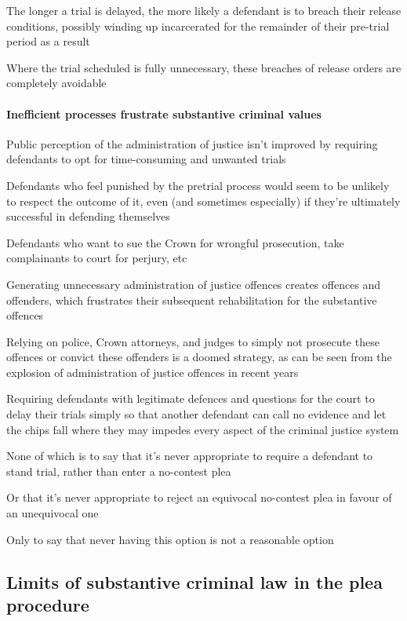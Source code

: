 The longer a trial is delayed, the more likely a defendant is to breach their release conditions, possibly winding up incarcerated for the remainder of their pre-trial period as a result

Where the trial scheduled is fully unnecessary, these breaches of release orders are completely avoidable

\paragraph{Inefficient processes frustrate substantive criminal values}

Public perception of the administration of justice isn't improved by requiring defendants to opt for time-consuming and unwanted trials

Defendants who feel punished by the pretrial process would seem to be unlikely to respect the outcome of it, even (and sometimes especially) if they're ultimately successful in defending themselves

Defendants who want to sue the Crown for wrongful prosecution, take complainants to court for perjury, etc

Generating unnecessary administration of justice offences creates offences and offenders, which frustrates their subsequent rehabilitation for the substantive offences

Relying on police, Crown attorneys, and judges to simply not prosecute these offences or convict these offenders is a doomed strategy, as can be seen from the explosion of administration of justice offences in recent years

Requiring defendants with legitimate defences and questions for the court to delay their trials simply so that another defendant can call no evidence and let the chips fall where they may impedes every aspect of the criminal justice system

None of which is to say that it's never appropriate to require a defendant to stand trial, rather than enter a no-contest plea

Or that it's never appropriate to reject an equivocal no-contest plea in favour of an unequivocal one

Only to say that never having this option is not a reasonable option

\subsection{Limits of substantive criminal law in the plea procedure}

